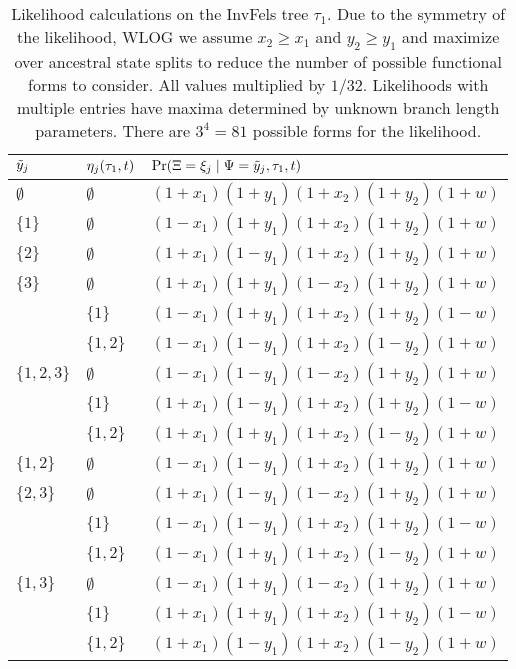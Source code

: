 \begin{table}
\centering
\begin{tabular}{|ll|l|}
\hline
$\tilde{y}_j$ & $\eta_j(\tau_1, t)$ & $\Pr(\Xi=\xi_j \mid \Psi=\tilde{y}_j,\tau_1,t)$\\
\hline
$\emptyset$&$\emptyset$&$(1+x_1)(1+y_1)(1+x_2)(1+y_2)(1+w)$\\

$\{1\}$    &$\emptyset$&$(1-x_1)(1+y_1)(1+x_2)(1+y_2)(1+w)$\\

$\{2\}$    &$\emptyset$&$(1+x_1)(1-y_1)(1+x_2)(1+y_2)(1+w)$\\

$\{3\}$    &$\emptyset$&$(1+x_1)(1+y_1)(1-x_2)(1+y_2)(1+w)$\\
&$\{1\}$&$(1-x_1)(1+y_1)(1+x_2)(1+y_2)(1-w)$\\
&$\{1,2\}$&$(1-x_1)(1-y_1)(1+x_2)(1-y_2)(1+w)$\\

$\{1,2,3\}$&$\emptyset$&$(1-x_1)(1-y_1)(1-x_2)(1+y_2)(1+w)$\\
&$\{1\}$&$(1+x_1)(1-y_1)(1+x_2)(1+y_2)(1-w)$\\
&$\{1,2\}$&$(1+x_1)(1+y_1)(1+x_2)(1-y_2)(1+w)$\\

$\{1,2\}$  &$\emptyset$&$(1-x_1)(1-y_1)(1+x_2)(1+y_2)(1+w)$\\

$\{2,3\}$  &$\emptyset$&$(1+x_1)(1-y_1)(1-x_2)(1+y_2)(1+w)$\\
&$\{1\}$&$(1-x_1)(1-y_1)(1+x_2)(1+y_2)(1-w)$\\
&$\{1,2\}$&$(1-x_1)(1+y_1)(1+x_2)(1-y_2)(1+w)$\\

$\{1,3\}$  &$\emptyset$&$(1-x_1)(1+y_1)(1-x_2)(1+y_2)(1+w)$\\
&$\{1\}$&$(1+x_1)(1+y_1)(1+x_2)(1+y_2)(1-w)$\\
&$\{1,2\}$&$(1+x_1)(1-y_1)(1+x_2)(1-y_2)(1+w)$\\
\hline
\end{tabular}
\caption{
Likelihood calculations on the InvFels tree $\tau_1$.
Due to the symmetry of the likelihood, WLOG we assume $x_2 \ge x_1$ and $y_2 \ge y_1$ and maximize over ancestral state splits to reduce the number of possible functional forms to consider.
All values multiplied by $1/32$.
Likelihoods with multiple entries have maxima determined by unknown branch length parameters.
There are $3^4=81$ possible forms for the likelihood.
}
\label{tab:likelihoods}
\end{table}

